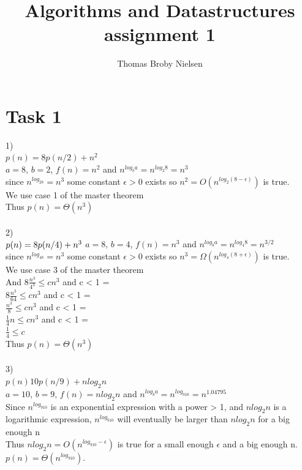 \documentclass[12pt]{article}
\title{Algorithms and Datastructures assignment 1}
\author{Thomas Broby Nielsen}
\begin{document}
\maketitle

\tableofcontents

\pagebreak
\section{Task 1}
1)
\\
$
p(n)=8p(n/2)+n^{2}
$\\
$a=8$, $b=2$, $f(n)=n^{2}$ and $n^{log_{b}a}=n^{log_{2}8}=n^3$\\
since $n^{log_28}=n^3$ some constant $\epsilon > 0 $ exists so $n^2=O(n^{log_2(8-\epsilon)})$ is true.\\ We use case 1 of the master theorem\\
Thus $p(n)=\Theta (n^3)$\\
\\
2)
\\
$p(n)=8p(n/4)+n^{3}\\$
$a=8$, $b=4$, $f(n)=n^{3}$ and $n^{log_{b}a}=n^{log_{4}8}=n^{3/2}$\\
since $n^{log_48}=n^3$ some constant $\epsilon > 0$ exists so $n^3=\Omega(n^{log_4(8+\epsilon)})$  is true.\\ We use case 3 of the master theorem\\
And $8 \frac {n^3}{4^3} \leq cn^3$ and c < 1 =\\
 $8 \frac {n^3}{64} \leq cn^3$ and c < 1 =\\
 $ \frac {n^3}{8} \leq cn^3$ and c < 1 =\\
 $ \frac {1}{4}n \leq cn^3$ and c < 1 =\\
 $  \frac {1}{4} \leq c$\\
Thus $p(n)=\Theta(n^3)$\\
\\
3)
\\
$p(n)10p(n/9)+nlog_2n$
\\
$a=10$, $b=9$, $f(n)=nlog_2n$ and $n^{log_{b}a}=n^{log_910}=n^{1.04795}$
\\
Since $n^{log_910}$ is an exponential expression with a power > 1, and $n log_2 n$ is a logarithmic expression, $n^{log_910}$ will eventually be larger than $n log_2 n$ for a big enough n
\\
Thus $n log_2 n = O(n^{log_910-\epsilon})$ is true for a small enough $\epsilon$ and a big enough n.
$p(n)=\Theta (n^{log_910}).$
\newpage
\end{document}
